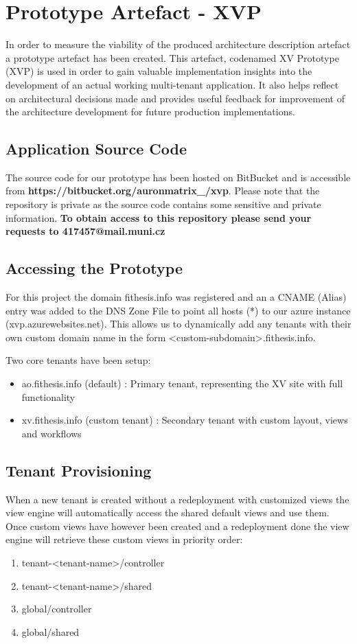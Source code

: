 \chapter{Prototype Artefact - XVP}

In order to measure the viability of the produced architecture description  artefact a prototype artefact has been created. This artefact, codenamed XV Prototype (XVP) is used in order to gain valuable implementation insights into the development of an actual working multi-tenant  application. It also helps reflect on architectural decisions made and provides useful feedback for improvement of the architecture development for future production implementations.

\section{Application Source Code}

The source code for our prototype has been hosted on BitBucket and is accessible from \textbf{https://bitbucket.org/auronmatrix\_/xvp}. Please note that the repository is private as the source code contains some sensitive and private information. \textbf{To obtain access to this repository please send your requests to 417457@mail.muni.cz}

\section{Accessing the Prototype}
For this project the domain fithesis.info was registered and an a CNAME (Alias) entry was added to the DNS Zone File to point all hosts (*) to our azure instance (xvp.azurewebsites.net). This allows us to dynamically add any tenants with their own custom domain name in the form
<custom-subdomain>.fithesis.info. 

Two core tenants have been setup:
\begin{itemize}
\item ao.fithesis.info (default) : Primary tenant, representing the XV site with full functionality
\item xv.fithesis.info (custom tenant) : Secondary tenant with custom layout, views and workflows
\end{itemize}

\section{Tenant Provisioning}
When a new tenant is created without a redeployment with customized views the view engine will automatically access the shared default views and use them. Once custom views have however been created and a redeployment done the view engine will retrieve these custom views in priority order:
\begin{enumerate}
\item tenant-<tenant-name>/controller
\item tenant-<tenant-name>/shared
\item global/controller
\item global/shared
\end{enumerate}

